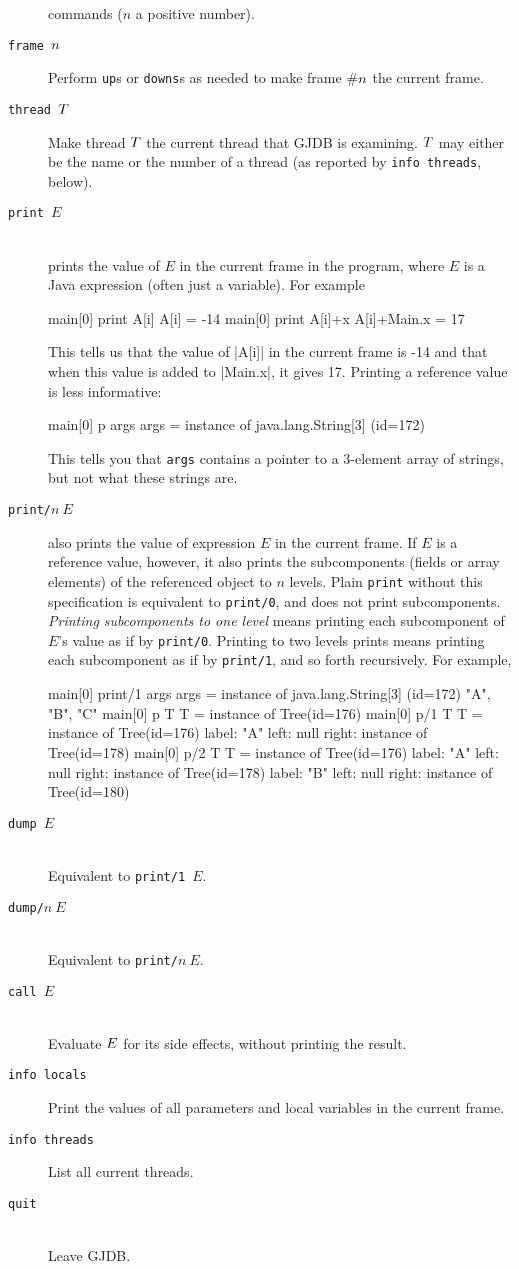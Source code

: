 \documentclass[11pt,twoside]{handout}
\begin{document}
\begin{description}
	  commands ($n$ a positive number).
\item[\tt frame $n\/$] Perform {\tt up}s or {\tt downs}s as needed to
make frame \#$n\/$ the current frame.
\item[\tt thread $T\/$] Make thread $T\/$ the current thread that GJDB 
is examining.  $T\/$ may either be the name or the number of a thread
(as reported by {\tt info
threads}, below).
\item[\tt print $E$] \ \\
prints the value of $E$ in the current frame in the program, where $E$
is a Java expression (often just a variable).  
For example
\begin{program}
main[0] print A[i]
A[i] = -14
main[0] print A[i]+x
A[i]+Main.x = 17
\end{program}
This tells us that the value of \prog|A[i]| in the current frame is -14
and that when this value is added to \prog|Main.x|, it gives 17.
Printing a reference value is less informative:
\begin{program}
main[0] p args
args = instance of java.lang.String[3] (id=172)
\end{program}
This tells you that {\tt args} contains a pointer to a 3-element array
of strings, but not what these strings are.  
\item[\tt print/$n~E$] 
also prints the value of expression $E$ in the current frame. If
$E$ is a reference value, however, it also prints the subcomponents
(fields or array elements) of the
referenced object to $n$ levels.  Plain {\tt print} without this
specification is equivalent to {\tt print/0}, and does not print
subcomponents. {\it Printing subcomponents
to one level\/} means printing each subcomponent of $E$'s
value as if by {\tt print/0}.  Printing to two levels prints means
printing each subcomponent as if by {\tt print/1}, and so forth recursively.
For example,
\begin{program}
main[0] print/1 args
args = instance of java.lang.String[3] (id=172) {
"A", "B", "C"
}
main[0] p T
T = instance of Tree(id=176)
main[0] p/1 T
T = instance of Tree(id=176) {
  label: "A"
  left: null
  right: instance of Tree(id=178)
}
main[0] p/2 T
T = instance of Tree(id=176) {
  label: "A"
  left: null
  right: instance of Tree(id=178) {
    label: "B"
    left: null
    right: instance of Tree(id=180)
  }
}
\end{program}
\item[\tt dump $E$] \ \\
Equivalent to {\tt print/1 $E$}.  
\item[\tt dump/$n~E$] \ \\
Equivalent to {\tt print/$n~E$}.  
\item[\tt call $E$] \ \\
Evaluate $E\/$ for its side effects, without printing the result.
\item[\tt info locals] Print the values of all parameters and 
local variables in the current frame.
\item[\tt info threads] List all current threads.
\item[\tt quit] \ \\
Leave GJDB.
\end{description}
\end{document}
